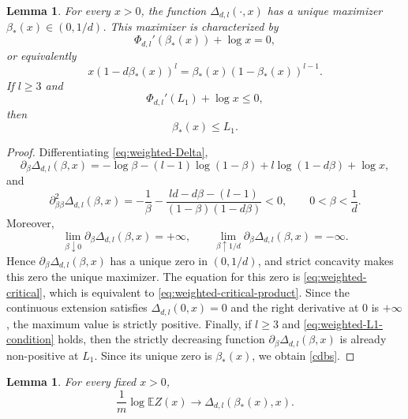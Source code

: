 \documentclass[11pt]{amsart}
\theoremstyle{plain}
\newtheorem{lemma}[theorem]{Lemma}
\numberwithin{equation}{section}
\numberwithin{theorem}{section}
\numberwithin{figure}{section}
\begin{document}
\begin{lemma}\label{lem:weighted-maximizer}
For every $x>0$, the function $\Delta_{d,l}(\cdot,x)$ has a unique maximizer
$\beta_*(x)\in(0,1/d)$.  This maximizer is characterized by
\begin{equation}\label{eq:weighted-critical}
  \Phi_{d,l}'(\beta_*(x))+\log x=0,
\end{equation}
or equivalently
\begin{equation}\label{eq:weighted-critical-product}
  x(1-d\beta_*(x))^l=\beta_*(x)(1-\beta_*(x))^{l-1}.
\end{equation}
If $l\ge3$ and
\begin{equation}\label{eq:weighted-L1-condition}
  \Phi_{d,l}'(L_1)+\log x\le0,
\end{equation}
then
\begin{equation}\label{cdbs}
  \beta_*(x)\le L_1 .
\end{equation}
\end{lemma}

\begin{proof}
Differentiating \eqref{eq:weighted-Delta},
\[
  \partial_\beta \Delta_{d,l}(\beta,x)
  =-\log\beta-(l-1)\log(1-\beta)+l\log(1-d\beta)+\log x,
\]
and
\[
  \partial_{\beta\beta}^2\Delta_{d,l}(\beta,x)
  =-\frac1\beta-
  \frac{ld-d\beta-(l-1)}{(1-\beta)(1-d\beta)}<0,
  \qquad 0<\beta<\frac1d .
\]
Moreover,
\[
  \lim_{\beta\downarrow0}\partial_\beta\Delta_{d,l}(\beta,x)=+\infty,
  \qquad
  \lim_{\beta\uparrow1/d}\partial_\beta\Delta_{d,l}(\beta,x)=-\infty .
\]
Hence $\partial_\beta\Delta_{d,l}(\beta,x)$ has a unique zero in $(0,1/d)$, and
strict concavity makes this zero the unique maximizer.  The equation for this zero is
\eqref{eq:weighted-critical}, which is equivalent to
\eqref{eq:weighted-critical-product}.  Since the continuous extension satisfies
$\Delta_{d,l}(0,x)=0$ and the right derivative at $0$ is $+\infty$, the maximum value is
strictly positive.  Finally, if $l\ge3$ and \eqref{eq:weighted-L1-condition} holds, then
the strictly decreasing function $\partial_\beta\Delta_{d,l}(\beta,x)$ is already
non-positive at $L_1$.  Since its unique zero is $\beta_*(x)$, we obtain \eqref{cdbs}.
\end{proof}

\begin{lemma}\label{lem:weighted-first-moment}
For every fixed $x>0$,
\begin{equation}\label{eq:weighted-first-moment}
  \frac1m\log \mathbb E Z(x)
  \longrightarrow
  \Delta_{d,l}(\beta_*(x),x).
\end{equation}
\end{lemma}
\end{document}
